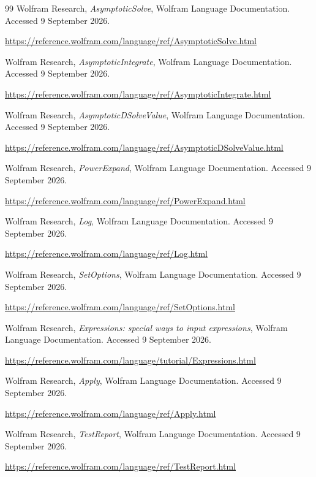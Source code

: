 \documentclass[11pt,a4paper]{article}
\begin{document}
\begin{thebibliography}{99}
 Wolfram Research, \emph{AsymptoticSolve}, Wolfram Language Documentation. Accessed 9 September 2026.\par
\url{https://reference.wolfram.com/language/ref/AsymptoticSolve.html}

 Wolfram Research, \emph{AsymptoticIntegrate}, Wolfram Language Documentation. Accessed 9 September 2026.\par
\url{https://reference.wolfram.com/language/ref/AsymptoticIntegrate.html}

 Wolfram Research, \emph{AsymptoticDSolveValue}, Wolfram Language Documentation. Accessed 9 September 2026.\par
\url{https://reference.wolfram.com/language/ref/AsymptoticDSolveValue.html}

 Wolfram Research, \emph{PowerExpand}, Wolfram Language Documentation. Accessed 9 September 2026.\par
\url{https://reference.wolfram.com/language/ref/PowerExpand.html}

 Wolfram Research, \emph{Log}, Wolfram Language Documentation. Accessed 9 September 2026.\par
\url{https://reference.wolfram.com/language/ref/Log.html}

 Wolfram Research, \emph{SetOptions}, Wolfram Language Documentation. Accessed 9 September 2026.\par
\url{https://reference.wolfram.com/language/ref/SetOptions.html}

 Wolfram Research, \emph{Expressions: special ways to input expressions}, Wolfram Language Documentation. Accessed 9 September 2026.\par
\url{https://reference.wolfram.com/language/tutorial/Expressions.html}

 Wolfram Research, \emph{Apply}, Wolfram Language Documentation. Accessed 9 September 2026.\par
\url{https://reference.wolfram.com/language/ref/Apply.html}

 Wolfram Research, \emph{TestReport}, Wolfram Language Documentation. Accessed 9 September 2026.\par
\url{https://reference.wolfram.com/language/ref/TestReport.html}

\end{thebibliography}
\end{document}
